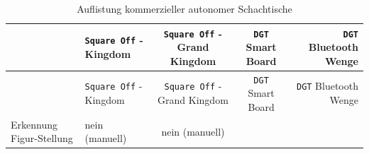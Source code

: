 \begin{longtable}[]{@{}llccr@{}}
\caption{Auflistung kommerzieller autonomer Schachtische
\label{commchesstables}}\tabularnewline
\toprule
\begin{minipage}[b]{0.19\columnwidth}\raggedright
\strut
\end{minipage} & \begin{minipage}[b]{0.19\columnwidth}\raggedright
\passthrough{\lstinline!Square Off!} - Kingdom\strut
\end{minipage} & \begin{minipage}[b]{0.20\columnwidth}\centering
\passthrough{\lstinline!Square Off!} - Grand Kingdom\strut
\end{minipage} & \begin{minipage}[b]{0.15\columnwidth}\centering
\passthrough{\lstinline!DGT!} Smart Board\strut
\end{minipage} & \begin{minipage}[b]{0.13\columnwidth}\raggedleft
\passthrough{\lstinline!DGT!} Bluetooth Wenge\strut
\end{minipage}\tabularnewline
\midrule
\endfirsthead
\toprule
\begin{minipage}[b]{0.19\columnwidth}\raggedright
\strut
\end{minipage} & \begin{minipage}[b]{0.19\columnwidth}\raggedright
\passthrough{\lstinline!Square Off!} - Kingdom\strut
\end{minipage} & \begin{minipage}[b]{0.20\columnwidth}\centering
\passthrough{\lstinline!Square Off!} - Grand Kingdom\strut
\end{minipage} & \begin{minipage}[b]{0.15\columnwidth}\centering
\passthrough{\lstinline!DGT!} Smart Board\strut
\end{minipage} & \begin{minipage}[b]{0.13\columnwidth}\raggedleft
\passthrough{\lstinline!DGT!} Bluetooth Wenge\strut
\end{minipage}\tabularnewline
\midrule
\endhead
\begin{minipage}[t]{0.19\columnwidth}\raggedright
Erkennung Figur-Stellung\strut
\end{minipage} & \begin{minipage}[t]{0.19\columnwidth}\raggedright
nein (manuell)\strut
\end{minipage} & \begin{minipage}[t]{0.20\columnwidth}\centering
nein (manuell)\strut

\end{minipage}
\end{longtable}
